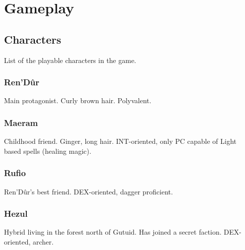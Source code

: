 \documentclass[a4paper,12pt]{book}
\begin{document}
\part{Gameplay}
\chapter{Characters}
List of the playable characters in the game.
\section{Ren'D\^{u}r}
Main protagonist. Curly brown hair. Polyvalent.
\section{Maeram}
Childhood friend. Ginger, long hair. INT-oriented, only PC capable of Light based spells (healing magic).
\section{Rufio}
Ren'D\^{u}r's best friend. DEX-oriented, dagger proficient.
\section{Hezul}
Hybrid living in the forest north of Gutuid. Has joined a secret faction. DEX-oriented, archer.
\end{document}
